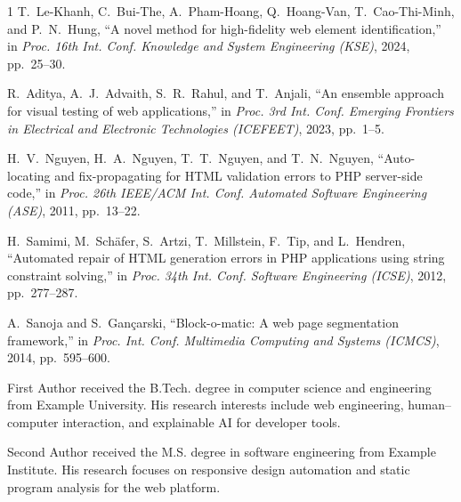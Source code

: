 \documentclass[conference]{IEEEtran}
\begin{document}
\begin{thebibliography}{1}
T.~Le-Khanh, C.~Bui-The, A.~Pham-Hoang, Q.~Hoang-Van,
T.~Cao-Thi-Minh, and P.~N.~Hung, ``A novel method for high-fidelity
web element identification,'' in \emph{Proc. 16th Int. Conf. Knowledge
and System Engineering (KSE)}, 2024, pp.~25--30.

R.~Aditya, A.~J.~Advaith, S.~R.~Rahul, and T.~Anjali, ``An ensemble
approach for visual testing of web applications,'' in \emph{Proc. 3rd
Int. Conf. Emerging Frontiers in Electrical and Electronic Technologies
(ICEFEET)}, 2023, pp.~1--5.

H.~V.~Nguyen, H.~A.~Nguyen, T.~T.~Nguyen, and T.~N.~Nguyen,
``Auto-locating and fix-propagating for HTML validation errors to PHP
server-side code,'' in \emph{Proc. 26th IEEE/ACM Int. Conf. Automated
Software Engineering (ASE)}, 2011, pp.~13--22.

H.~Samimi, M.~Sch\"{a}fer, S.~Artzi, T.~Millstein, F.~Tip, and
L.~Hendren, ``Automated repair of HTML generation errors in PHP
applications using string constraint solving,'' in \emph{Proc. 34th
Int. Conf. Software Engineering (ICSE)}, 2012, pp.~277--287.

A.~Sanoja and S.~Gan\c{c}arski, ``Block-o-matic: A web page
segmentation framework,'' in \emph{Proc. Int. Conf. Multimedia
Computing and Systems (ICMCS)}, 2014, pp.~595--600.

\end{thebibliography}

\vspace{12pt}
\begin{IEEEbiographynophoto}{First Author}
received the B.Tech. degree in computer science and engineering from
Example University. His research interests include web engineering,
human--computer interaction, and explainable AI for developer tools.
\end{IEEEbiographynophoto}

\begin{IEEEbiographynophoto}{Second Author}
received the M.S. degree in software engineering from Example Institute.
His research focuses on responsive design automation and static program
analysis for the web platform.
\end{IEEEbiographynophoto}
\end{document}
